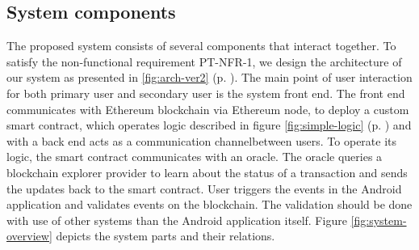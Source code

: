 \subsection{System components}
The proposed system consists of several components that interact together. To satisfy the non-functional requirement PT-NFR-1, we design the architecture of our system as presented in \ref{fig:arch-ver2} (p. \pageref{fig:arch-ver2}). The main point of user interaction for both primary user and secondary user is the system front end. The front end communicates with Ethereum blockchain via Ethereum node, to deploy a custom smart contract, which operates logic described in figure \ref{fig:simple-logic} (p. \pageref{fig:simple-logic}) and with a back end acts as a communication channel\footnotemark between users. To operate its logic, the smart contract communicates with an oracle. The oracle queries a blockchain explorer provider to learn about the status of a transaction and sends the updates back to the smart contract. User triggers the events in the Android application and validates events on the blockchain. The validation should be done with use of other systems than the Android application itself. Figure \ref{fig:system-overview} depicts the system parts and their relations.


